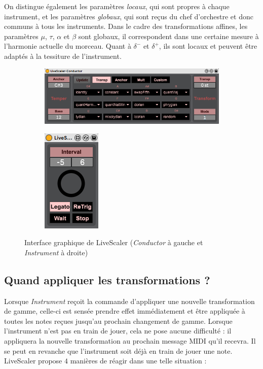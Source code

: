 \documentclass{article}
\begin{document}
On distingue également les paramètres \emph{locaux}, qui sont propres à chaque instrument, et les paramètres \emph{globaux}, qui sont reçus du chef d'orchestre et donc communs à tous les instruments. Dans le cadre des transformations affines, les paramètres $\mu$, $\tau$, $\alpha$  et $\beta$ sont globaux, il correspondent dans une certaine mesure à l'harmonie actuelle du morceau. Quant à $\delta^-$ et $\delta^+$, ils sont locaux et peuvent être adaptés à la tessiture de l'instrument.
\begin{figure}[h]
  \centering
  \begin{subfigure}{0.83\textwidth}
    \includegraphics{LS-Conductor-UI.png}
  \end{subfigure}
  \begin{subfigure}{0.15\textwidth}
    \includegraphics{LS-Instrument-UI.png}
  \end{subfigure}

  \caption{Interface graphique de LiveScaler (\emph{Conductor} à gauche  et  \emph{Instrument} à droite) }
  \label{fig:LiveScalerUI}
\end{figure}

\subsection{Quand appliquer les transformations ? }
Lorsque \emph{Instrument} reçoit la commande d'appliquer une nouvelle transformation de gamme, celle-ci est sensée prendre effet immédiatement et être appliquée à toutes les notes reçues jusqu'au prochain changement de gamme. Lorsque l'instrument n'est pas en train de jouer, cela ne pose aucune difficulté : il appliquera la nouvelle transformation au prochain message MIDI qu'il recevra. Il se peut en revanche que l'instrument soit déjà en train de jouer une note. LiveScaler propose $4$ manières de réagir dans une telle situation :
\end{document}
